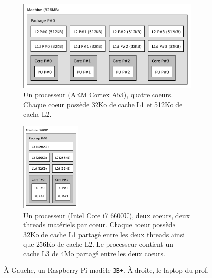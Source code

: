 \begin{figure}[htpb]
      \centering
  \begin{subfigure}[t]{0.4\textwidth}
    \centering
    \includegraphics[width=\textwidth]{lstopo_rpi3b.pdf}
    \caption{Un processeur (ARM Cortex A53), quatre coeurs. Chaque coeur possède
      32Ko de cache L1 et 512Ko de cache L2.}
  \end{subfigure}
  \hspace{5mm}
  \begin{subfigure}[t]{0.4\textwidth}
        \centering
    \includegraphics[width=3cm]{lstopo_laptop.pdf}
    \caption{Un processeur (Intel Core i7 6600U), deux coeurs, deux threads
      matériels par coeur. Chaque coeur possède 32Ko de cache L1 partagé entre
      les deux threads ainsi que 256Ko de cache L2. Le processeur contient un
      cache L3 de 4Mo partagé entre les deux coeurs.}
  \end{subfigure}
  \caption{À Gauche, un Raspberry Pi modèle \texttt{3B+}. À droite, le laptop du prof. \label{fig:arch1-bis}}
\end{figure}

